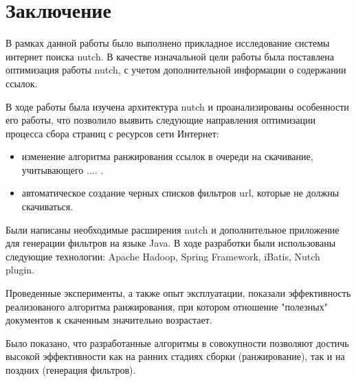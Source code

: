 \chapter*{Заключение}  В рамках данной
работы было выполнено прикладное исследование системы интернет поиска nutch. В
качестве изначальной цели работы была поставлена оптимизация работы nutch, с
учетом дополнительной информации о содержании ссылок.

В ходе работы была изучена архитектура nutch и проанализированы особенности его работы,
что позволило выявить следующие направления оптимизации процесса сбора страниц с ресурсов 
сети Интернет:
\begin{itemize} 
\item изменение алгоритма ранжирования ссылок в очереди на скачивание, учитывающего .... .
\item автоматическое создание черных списков фильтров url, которые не
    должны скачиваться. 
\end{itemize}

Были написаны необходимые расширения nutch и дополнительное приложение для
генерации фильтров на языке Java. В ходе разработки были использованы следующие
технологии: Apache Hadoop, Spring Framework, iBatis, Nutch plugin.

Проведенные эксперименты, а также опыт эксплуатации, показали эффективность реализованого 
алгоритма ранжирования, при котором отношение "полезных" документов к скаченным 
значительно возрастает.

Было показано, что разработанные алгоритмы в совокупности позволяют достичь
высокой эффективности как на ранних стадиях сборки (ранжирование), так и на
поздних (генерация фильтров).
